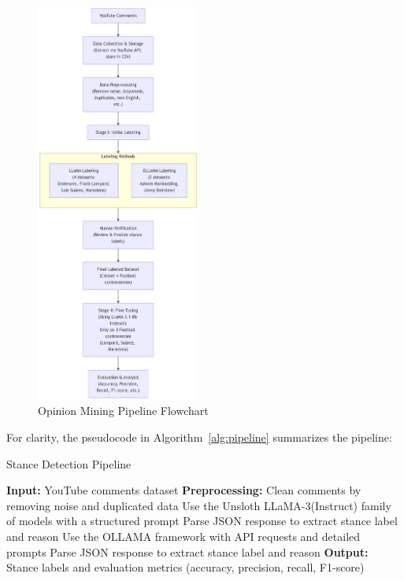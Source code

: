 \documentclass{article}
\begin{document}
\begin{figure}[ht]
\centering
\includegraphics[width=0.48\textwidth]{pipeline.jpg}  %
\caption{Opinion Mining Pipeline Flowchart}
\label{fig:pipeline}
\end{figure}

For clarity, the pseudocode in Algorithm~\ref{alg:pipeline} summarizes the pipeline:

\begin{algorithm}[h]
\caption{Stance Detection Pipeline}
\label{alg:pipeline}
\begin{algorithmic}[1]
\STATE \textbf{Input:} YouTube comments dataset
\STATE \textbf{Preprocessing:} Clean comments by removing noise and duplicated data
    \STATE Use the Unsloth LLaMA-3(Instruct) family of models with a structured prompt
    \STATE Parse JSON response to extract stance label and reason
\ELSE
    \STATE Use the OLLAMA framework with API requests and detailed prompts
    \STATE Parse JSON response to extract stance label and reason
\ENDIF
\STATE \textbf{Output:} Stance labels and evaluation metrics (accuracy, precision, recall, F1-score)

\end{algorithmic}
\end{algorithm}
\end{document}

